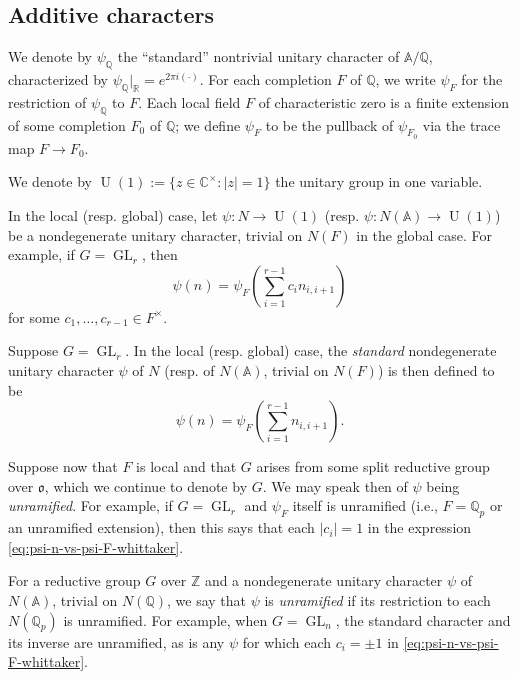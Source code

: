 \documentclass[reqno]{amsart}
\DeclareMathOperator{\GL}{GL}
\DeclareMathOperator{\U}{U}
\theoremstyle{plain} \newtheorem{theorem} {Theorem}
\theoremstyle{definition} \newtheorem{definition} [theorem] {Definition}
\theoremstyle{itplain} %
\numberwithin{equation}{section}
\numberwithin{theorem}{section}
\begin{document}
\subsection{Additive characters}\label{sec:stand-nond-char}
We denote by $\psi_{\mathbb{Q}}$ the ``standard'' nontrivial unitary character of $\mathbb{A}/\mathbb{Q}$, characterized by $\psi_{\mathbb{Q}}|_{\mathbb{R}} = e^{2 \pi i (\cdot)}$.  For each completion $F$ of $\mathbb{Q}$, we write $\psi_F$ for the restriction of $\psi_{\mathbb{Q}}$ to $F$.  Each local field $F$ of characteristic zero is a finite extension of some completion $F_0$ of $\mathbb{Q}$; we define $\psi_F$ to be the pullback of $\psi_{F_0}$ via the trace map $F \rightarrow F_0$.

We denote by $\U(1) := \{z \in \mathbb{C}^\times : |z| = 1\}$ the unitary group in one variable.

In the local (resp. global) case, let $\psi : N \rightarrow \U(1)$ (resp. $\psi : N(\mathbb{A}) \rightarrow \U(1)$) be a nondegenerate unitary character, trivial on $N(F)$ in the global case.  For example, if $G = \GL_r$, then
\begin{equation}\label{eq:psi-n-vs-psi-F-whittaker}
  \psi(n) = \psi_F\left(\sum_{i=1}^{r-1} c_i n_{i,i+1}\right)
\end{equation}
for some $c_1,\dotsc,c_{r-1} \in F^\times$.

Suppose $G = \GL_r$.  In the local (resp. global) case, the \emph{standard} nondegenerate unitary character $\psi$ of $N$ (resp. of $N(\mathbb{A})$, trivial on $N(F)$) is then defined to be
\begin{equation}\label{eq:psin-=-psi_f}
  \psi(n) = \psi_{F} \left( \sum_{i=1}^{r-1} n_{i,i+1} \right).
\end{equation}

Suppose now that $F$ is local and that $G$ arises from some split reductive group over $\mathfrak{o}$, which we continue to denote by $G$.  We may speak then of $\psi$ being \emph{unramified}.  For example, if $G = \GL_r$ and $\psi_F$ itself is unramified (i.e., $F = \mathbb{Q}_p$ or an unramified extension), then this says that each $|c_i| = 1$ in the expression \eqref{eq:psi-n-vs-psi-F-whittaker}.

For a reductive group $G$ over $\mathbb{Z}$ and a nondegenerate unitary character $\psi$ of $N(\mathbb{A})$, trivial on $N(\mathbb{Q})$, we say that $\psi$ is \emph{unramified} if its restriction to each $N(\mathbb{Q}_p)$ is unramified.  For example, when $G = \GL_n$, the standard character and its inverse are unramified, as is any $\psi$ for which each $c_i = \pm 1$ in \eqref{eq:psi-n-vs-psi-F-whittaker}.
\end{document}
